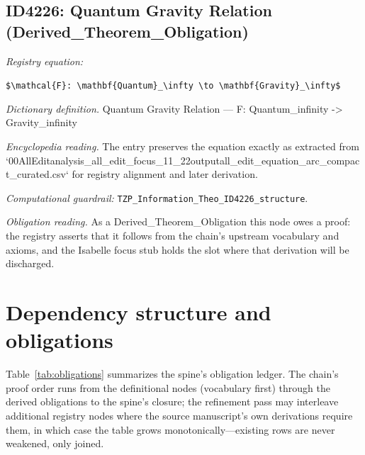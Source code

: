 \documentclass[11pt]{article}
\theoremstyle{remark}
\begin{document}
\subsection{ID4226: Quantum Gravity Relation (Derived\_Theorem\_Obligation)}

\noindent\textit{Registry equation:}\par
{\small\texttt{\$\textbackslash{}mathcal\{F\}: \textbackslash{}mathbf\{Quantum\}\_\textbackslash{}infty \textbackslash{}to \textbackslash{}mathbf\{Gravity\}\_\textbackslash{}infty\$}}\par\medskip
\noindent\textit{Dictionary definition.} Quantum Gravity Relation --- F: Quantum\_infinity -> Gravity\_infinity\par\medskip
\noindent\textit{Encyclopedia reading.} The entry preserves the equation exactly as extracted from `00AllEditanalysis\_all\_edit\_focus\_11\_22outputall\_edit\_equation\_arc\_compact\_curated.csv` for registry alignment and later derivation.
\par\medskip\noindent\textit{Computational guardrail:} \texttt{TZP\_Information\_Theo\_ID4226\_structure}.
\par\medskip\noindent\textit{Obligation reading.} As a Derived\_Theorem\_Obligation this node owes a proof: the registry asserts that it follows from the chain's upstream vocabulary and axioms, and the Isabelle focus stub holds the slot where that derivation will be discharged.

\section{Dependency structure and obligations}
\label{sec:dep}

Table~\ref{tab:obligations} summarizes the spine's obligation ledger. The chain's proof order runs from the definitional nodes (vocabulary first) through the derived obligations to the spine's closure; the refinement pass may interleave additional registry nodes where the source manuscript's own derivations require them, in which case the table grows monotonically---existing rows are never weakened, only joined.
\end{document}
